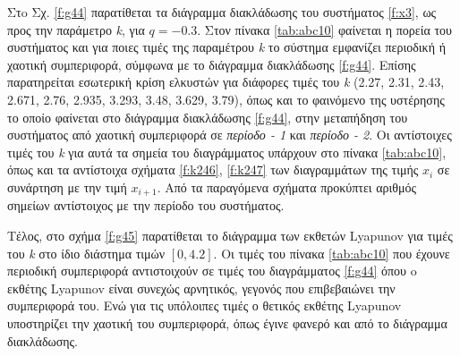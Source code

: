 Στo Σχ. \ref{f:g44} παρατίθεται τα διάγραμμα διακλάδωσης του συστήματος \ref{f:x3}, ως προς την παράμετρο \emph{k}, για $q =- 0.3$. 
Στον πίνακα \ref{tab:abc10} φαίνεται η πορεία του συστήματος και για ποιες τιμές της παραμέτρου \emph{k} το σύστημα εμφανίζει περιοδική ή χαοτική συμπεριφορά, σύμφωνα με το διάγραμμα διακλάδωσης \ref{f:g44}. Επίσης παρατηρείται εσωτερική κρίση ελκυστών για διάφορες τιμές του \emph{k} (2.27, 2.31, 2.43, 2.671, 2.76, 2.935, 3.293, 3.48, 3.629, 3.79), όπως και το φαινόμενο της υστέρησης το οποίο φαίνεται στο διάγραμμα διακλάδωσης \ref{f:g44}, στην μεταπήδηση του συστήματος από χαοτική συμπεριφορά σε \emph{περίοδο - 1} και \emph{περίοδο - 2}. Οι αντίστοιχες τιμές του \emph{k} για αυτά τα σημεία του διαγράμματος υπάρχουν στο πίνακα \ref{tab:abc10}, όπως και τα αντίστοιχα σχήματα \ref{f:k246}, \ref{f:k247} των διαγραμμάτων της τιμής \(x_i\) σε συνάρτηση με την τιμή \(x_{i+1}\). Από τα παραγόμενα σχήματα προκύπτει αριθμός σημείων αντίστοιχος με την περίοδο του συστήματος.

Τέλος, στο σχήμα \ref{f:g45} παρατίθεται το διάγραμμα των εκθετών Lyapunov για τιμές του \emph{k} στο ίδιο διάστημα τιμών $[0, 4.2]$. Οι τιμές του πίνακα \ref{tab:abc10} που έχουνε περιοδική συμπεριφορά αντιστοιχούν σε τιμές του διαγράμματος \ref{f:g44} όπου o εκθέτης Lyapunov είναι συνεχώς αρνητικός, γεγονός που επιβεβαιώνει την συμπεριφορά του. Ενώ για τις υπόλοιπες τιμές ο θετικός εκθέτης Lyapunov υποστηρίζει την χαοτική του συμπεριφορά, όπως έγινε φανερό και από το διάγραμμα διακλάδωσης.\\\\





